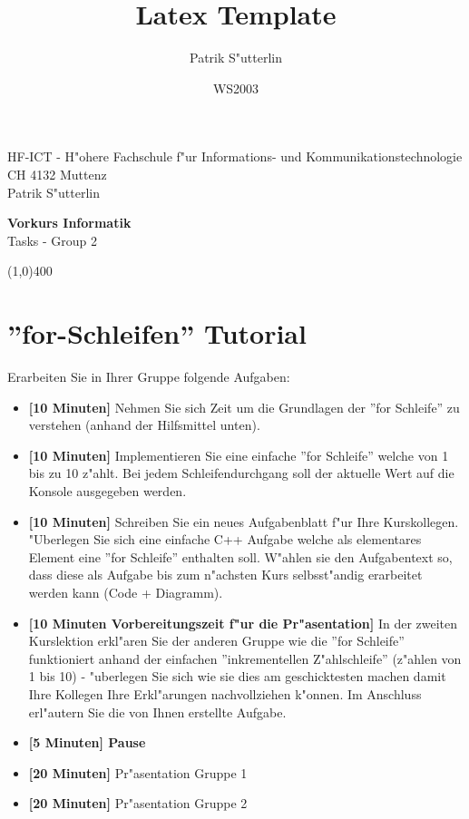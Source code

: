 \documentclass[a4paper,10pt]{article}
\title{Latex Template}
\author{Patrik S"utterlin}
\date{WS2003}
\begin{document}
HF-ICT - H"ohere Fachschule f"ur Informations- und Kommunikationstechnologie\\
CH 4132 Muttenz\\
Patrik S"utterlin

\vspace{2mm}

\begin{center}
{\Large \bf Vorkurs Informatik}\\
Tasks - Group 2
\end{center}

\vspace{2mm}

\line(1,0){400}

\vspace{5mm}

\section{''for-Schleifen'' Tutorial}
Erarbeiten Sie in Ihrer Gruppe folgende Aufgaben:

\begin{itemize}
\item \textbf{[10 Minuten]} Nehmen Sie sich Zeit um die Grundlagen der ''for Schleife'' zu verstehen (anhand der Hilfsmittel unten).
\item \textbf{[10 Minuten]} Implementieren Sie eine einfache ''for Schleife'' welche von 1 bis zu 10 z"ahlt. Bei jedem Schleifendurchgang soll der aktuelle Wert auf die Konsole ausgegeben werden.
\item \textbf{[10 Minuten]}  Schreiben Sie ein neues Aufgabenblatt f"ur Ihre Kurskollegen. "Uberlegen Sie sich eine einfache C++ Aufgabe welche als elementares Element eine ''for Schleife'' enthalten soll. W"ahlen sie den Aufgabentext so, dass diese als Aufgabe bis zum n"achsten Kurs selbsst"andig erarbeitet werden kann (Code + Diagramm).
\item \textbf{[10 Minuten Vorbereitungszeit f"ur die Pr"asentation]} In der zweiten Kurslektion erkl"aren Sie der anderen Gruppe wie die ''for Schleife'' funktioniert anhand der einfachen ''inkrementellen Z"ahlschleife'' (z"ahlen von 1 bis 10) - "uberlegen Sie sich wie sie dies am geschicktesten machen damit Ihre Kollegen Ihre Erkl"arungen nachvollziehen k"onnen. Im Anschluss erl"autern Sie die von Ihnen erstellte Aufgabe.
\item \textbf{[5 Minuten] Pause}
\item \textbf{[20 Minuten]} Pr"asentation Gruppe 1
\item \textbf{[20 Minuten]} Pr"asentation Gruppe 2
\end{itemize}
\end{document}

